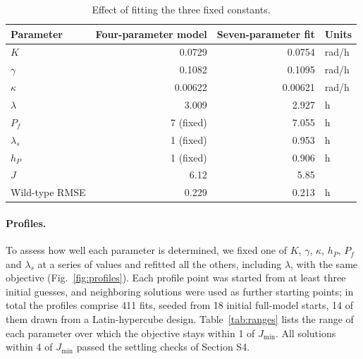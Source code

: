 \documentclass[10pt,a4paper]{article}
\begin{document}
\begin{table}[!htb]
\centering\small
\begin{tabular}{lrrl}
\toprule
Parameter & Four-parameter model & Seven-parameter fit & Units\\
\midrule
$K$ & 0.0729 & 0.0754 & rad/h\\
$\gamma$ & 0.1082 & 0.1095 & rad/h\\
$\kappa$ & 0.00622 & 0.00621 & rad/h\\
$\lambda$ & 3.009 & 2.927 & h\\
$P_f$ & 7 (fixed) & 7.055 & h\\
$\lambda_s$ & 1 (fixed) & 0.953 & h\\
$h_P$ & 1 (fixed) & 0.906 & h\\
\midrule
$J$ & 6.12 & 5.85 & \\
Wild-type RMSE & 0.229 & 0.213 & h\\
\bottomrule
\end{tabular}
\caption{Effect of fitting the three fixed constants.}
\label{tab:seven}
\end{table}

\paragraph{Profiles.}
To assess how well each parameter is determined, we fixed one of $K$,
$\gamma$, $\kappa$, $h_P$, $P_f$ and $\lambda_s$ at a series of values
and refitted all the others, including $\lambda$, with the same
objective (Fig.~\ref{fig:profiles}). Each profile point was started from
at least three initial guesses, and neighboring solutions were used as
further starting points; in total the profiles comprise 411 fits,
seeded from 18 initial full-model starts, 14 of them drawn from a
Latin-hypercube design. Table~\ref{tab:ranges} lists the range of each
parameter over which the objective stays within 1 of $J_{\min}$. All
solutions within 4 of $J_{\min}$ passed the settling checks of
Section S4.
\end{document}
